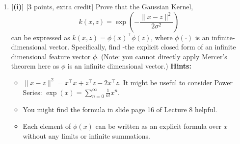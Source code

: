 \documentclass[lang=cn,11pt]{elegantbook}
\begin{document}
\begin{enumerate}
\begin{proof}
\begin{align}
& + (\sqrt{2}x_2)(\sqrt{2}z_2) + (x_1^2)(z_1^2)+ (x_2^2)(z_2^2) + 1 \\
& =   2\,x_1x_2\,z_1z_2
  + 2\,x_1\,z_1+ 2\,x_2\,z_2
  + x_1^2\,z_1^2 + x_2^2\,z_2^2 +  1
\end{align}
which matches the polynomial expansion exactly.  Thus 
\[
  k(\mathbf{x}, \mathbf{z}) = \phi(\mathbf{x})^\top\phi(\mathbf{z})
\]
\end{proof}
    \item \textbf{[(i)]} [3 points, extra credit] Prove that the Gaussian Kernel, \[
        k(x, z) = \exp \left( -\frac{\|x - z\|^2}{2\sigma^2} \right)
    \]
    can be expressed as $k(x, z) = \phi(x)^\top \phi(z)$, where $\phi(\cdot)$ is an infinite-dimensional vector. Specifically, find -the explicit closed form of an infinite dimensional feature vector $\phi$. (Note: you cannot directly apply Mercer's theorem here as $\phi$ is an infinite dimensional vector.)
    \textbf{Hints:}
    \begin{itemize}
        \item $\|x - z\|^2 = x^\top x + z^\top z - 2x^\top z$. It might be useful to consider Power Series: $\exp(x) = \sum\limits_{n=0}^{\infty} \frac{1}{n!} x^n$.
        \item You might find the formula in slide page 16 of Lecture 8 helpful.
        \item Each element of $\phi(x)$ can be written as an explicit formula over $x$ without any limits or infinite summations.
    \end{itemize}
\end{enumerate}
\end{document}
